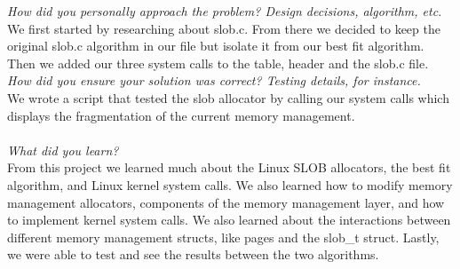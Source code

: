 \documentclass[letterpaper,10pt,titlepage]{article}
\begin{document}
\textit{How did you personally approach the problem? Design decisions, algorithm, etc.}\\

We first started by researching about slob.c. From there we decided to keep the original slob.c algorithm in our file but isolate it from our best fit algorithm. Then we added our three system calls to the table, header and the slob.c file.\\

\textit{How did you ensure your solution was correct? Testing details, for instance.}\\

We wrote a script that tested the slob allocator by calling our system calls which displays the fragmentation of the current memory management. \\
 \\

\textit{What did you learn?}\\
From this project we learned much about the Linux SLOB allocators, the best fit algorithm, and Linux kernel system calls. We also learned how to modify memory management allocators, components of the memory management layer, and how to implement kernel system calls. We also learned about the interactions between different memory management structs, like pages and the slob\_t struct. Lastly, we were able to test and see the results between the two algorithms.\\
\end{document}
